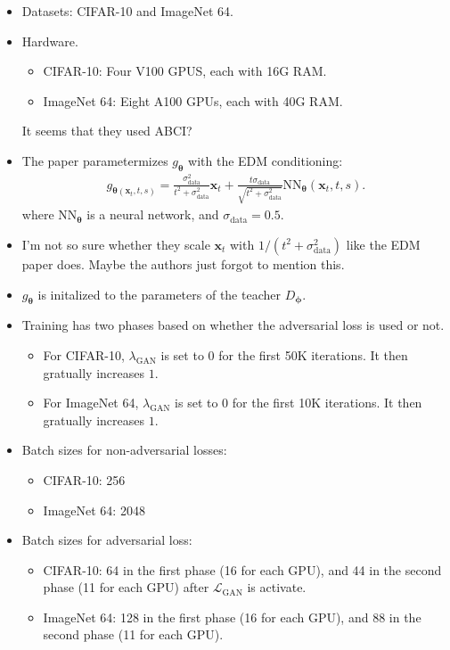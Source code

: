 \documentclass[10pt]{article}
\newcommand{\ve}[1]{\mathbf{#1}}
\newcommand{\ves}[1]{\boldsymbol{#1}}
\newcommand{\mrm}[1]{\mathrm{#1}}
\newcommand{\mcal}[1]{\mathcal{#1}}
\newcommand{\data}{\mathrm{data}}
\begin{document}
\begin{itemize}
  \item Datasets: CIFAR-10 and ImageNet 64.

  \item Hardware.
  \begin{itemize}
    \item CIFAR-10: Four V100 GPUS, each with 16G RAM.
    \item ImageNet 64: Eight A100 GPUs, each with 40G RAM.
  \end{itemize}
  It seems that they used ABCI?

  \item The paper parametermizes $g_{\ves{\theta}}$ with the EDM conditioning:
  \begin{align*}
    g_{\ves{\theta}(\ve{x}_t, t, s)} = \frac{\sigma_{\data}^2}{t^2 + \sigma_{\data}^2} \ve{x}_t + \frac{t \sigma_{\data}}{\sqrt{t^2 + \sigma_{\data}^2}} \mrm{NN}_{\ves{\theta}}(\ve{x}_t, t, s).
  \end{align*}
  where $\mrm{NN}_{\ves{\theta}}$ is a neural network, and $\sigma_{\data} = 0.5$. 
  
  \item I'm not so sure whether they scale $\ve{x}_t$ with $1/(t^2 + \sigma^2_{\data})$ like the EDM paper does. Maybe the authors just forgot to mention this.

  \item $g_{\ves{\theta}}$ is initalized to the parameters of the teacher $D_{\ves{\phi}}$.
    
  \item Training has two phases based on whether the adversarial loss is used or not.
  \begin{itemize}
    \item For CIFAR-10, $\lambda_{\mrm{GAN}}$ is set to $0$ for the first 50K iterations. It then gratually increases $1$.
    \item For ImageNet 64, $\lambda_{\mrm{GAN}}$ is set to $0$ for the first 10K iterations. It then gratually increases $1$.
  \end{itemize}

  \item Batch sizes for non-adversarial losses:
  \begin{itemize}
    \item CIFAR-10: 256
    \item ImageNet 64: 2048
  \end{itemize}

  \item Batch sizes for adversarial loss:
  \begin{itemize}
    \item CIFAR-10: 64 in the first phase (16 for each GPU), and 44 in the second phase (11 for each GPU) after $\mcal{L}_{\mathrm{GAN}}$ is activate.
    \item ImageNet 64: 128 in the first phase (16 for each GPU), and 88 in the second phase (11 for each GPU).
  \end{itemize}


\end{itemize}
\end{document}
